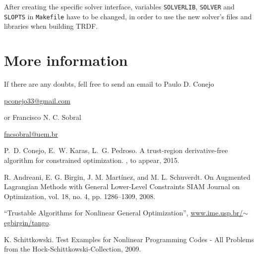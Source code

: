 \documentclass[12pt]{article}
\newcommand{\HR}[2]{\href{#1}{#2}}
\begin{document}
After creating the specific solver interface, variables
\texttt{SOLVERLIB}, \texttt{SOLVER} and \texttt{SLOPTS} in
\texttt{Makefile} have to be changed, in order to use the new solver's
files and libraries when building TRDF.

\section*{More information}

If there are any doubts, fell free to send an email to Paulo
D. Conejo
\begin{center}
  \url{pconejo33@gmail.com}
\end{center}
or Francisco N. C. Sobral
\begin{center}
  \url{fncsobral@uem.br}
\end{center}


\begin{thebibliography}{10}
P.~D. Conejo, E.~W. Karas, L.~G. Pedroso.
\newblock  A trust-region derivative-free algorithm for constrained optimization.
, to appear, 2015.

 R. Andreani, E. G. Birgin, J. M. Martínez, and
  M. L. Schuverdt.  \newblock On Augmented Lagrangian Methods with
  General Lower-Level Constraints \newblock SIAM Journal on
  Optimization, vol. 18, no. 4, pp. 1286–1309, 2008.

 ``Trustable Algorithms for Nonlinear General
  Optimization'',
  \HR{www.ime.usp.br/$\sim$egbirgin/tango}{www.ime.usp.br/$\sim$egbirgin/tango}.

 K. Schittkowski. \newblock Test Examples for Nonlinear
  Programming Codes - All Problems from the
  Hock-Schittkowski-Collection, 2009.
\end{thebibliography}
\end{document}
